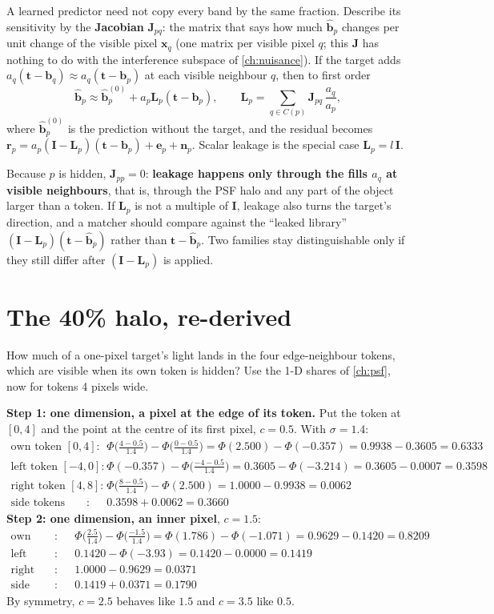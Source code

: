 \documentclass[11pt,a4paper,oneside,openany]{book}
\newcommand{\B}[1]{{\symbf{#1}}}
\newcommand{\B}[1]{{\bm{#1}}}
\newcommand{\vx}{\B{x}}
\newcommand{\vt}{\B{t}}
\newcommand{\vb}{\B{b}}
\newcommand{\vbh}{\hat{\B{b}}}
\newcommand{\vr}{\B{r}}
\newcommand{\ve}{\B{e}}
\newcommand{\vn}{\B{n}}
\newcommand{\mJ}{\B{J}}
\newcommand{\mL}{\B{L}}
\newcommand{\mI}{\B{I}}
\begin{document}
A learned predictor need not copy every band by the same fraction. Describe its sensitivity by the \textbf{Jacobian} $\mJ_{pq}$: the matrix that says how much
$\vbh_p$ changes per unit change of the visible pixel $\vx_q$ (one matrix per visible pixel $q$; this $\mJ$ has nothing to do with the interference
subspace of \cref{ch:nuisance}). If the target adds $a_q(\vt-\vb_q)\approx a_q(\vt-\vb_p)$ at each visible neighbour $q$, then to first order
\[
  \vbh_p\approx\vbh_p^{(0)}+a_p\mL_p(\vt-\vb_p),\qquad \mL_p=\sum_{q\in C(p)}\mJ_{pq}\,\frac{a_q}{a_p},
\]
where $\vbh_p^{(0)}$ is the prediction without the target, and the residual becomes $\vr_p=a_p(\mI-\mL_p)(\vt-\vb_p)+\ve_p+\vn_p$. Scalar leakage is the
special case $\mL_p=l\,\mI$.

Because $p$ is hidden, $\mJ_{pp}=0$: \textbf{leakage happens only through the fills $a_q$ at visible neighbours}, that is, through the PSF halo and any part of the
object larger than a token. If $\mL_p$ is not a multiple of $\mI$, leakage also turns the target's direction, and a matcher should compare against the
``leaked library'' $(\mI-\mL_p)(\vt-\vbh_p)$ rather than $\vt-\vbh_p$. Two families stay distinguishable only if they still differ after $(\mI-\mL_p)$ is applied.

\section{The 40\% halo, re-derived}

How much of a one-pixel target's light lands in the four edge-neighbour tokens, which are visible when its own token is hidden? Use the 1-D shares
of \cref{ch:psf}, now for tokens 4 pixels wide.

\textbf{Step 1: one dimension, a pixel at the edge of its token.} Put the token at $[0,4]$ and the point at the centre of its first pixel, $c=0.5$.
With $\sigma=1.4$:
\begin{align*}
\text{own token }[0,4]: &\quad \Phi\big(\tfrac{4-0.5}{1.4}\big)-\Phi\big(\tfrac{0-0.5}{1.4}\big)=\Phi(2.500)-\Phi(-0.357)=0.9938-0.3605=0.6333\\
\text{left token }[-4,0]: &\quad \Phi(-0.357)-\Phi\big(\tfrac{-4-0.5}{1.4}\big)=0.3605-\Phi(-3.214)=0.3605-0.0007=0.3598\\
\text{right token }[4,8]: &\quad \Phi\big(\tfrac{8-0.5}{1.4}\big)-\Phi(2.500)=1.0000-0.9938=0.0062\\
\text{side tokens together}: &\quad 0.3598+0.0062=0.3660
\end{align*}
\textbf{Step 2: one dimension, an inner pixel}, $c=1.5$:
\begin{align*}
\text{own token}: &\quad \Phi\big(\tfrac{2.5}{1.4}\big)-\Phi\big(\tfrac{-1.5}{1.4}\big)=\Phi(1.786)-\Phi(-1.071)=0.9629-0.1420=0.8209\\
\text{left token}: &\quad 0.1420-\Phi(-3.93)=0.1420-0.0000=0.1419\\
\text{right token}: &\quad 1.0000-0.9629=0.0371\\
\text{side tokens together}: &\quad 0.1419+0.0371=0.1790
\end{align*}
By symmetry, $c=2.5$ behaves like $1.5$ and $c=3.5$ like $0.5$.
\end{document}
